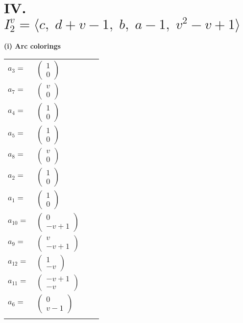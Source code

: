 \documentclass[1p]{elsarticle_modified}
\theoremstyle{definition}
\begin{document}
\centering \section*{IV. $I^v_{2}= \langle c,\;d+v-1,\;b,\;a-1,\;v^2- v+1 \rangle$}
\flushleft \textbf{(i) Arc colorings}\\
\begin{tabular}{m{7pt} m{180pt} m{7pt} m{180pt} }
\flushright $a_{3}=$&$\begin{pmatrix}1\\0\end{pmatrix}$ \\
\flushright $a_{7}=$&$\begin{pmatrix}v\\0\end{pmatrix}$ \\
\flushright $a_{4}=$&$\begin{pmatrix}1\\0\end{pmatrix}$ \\
\flushright $a_{5}=$&$\begin{pmatrix}1\\0\end{pmatrix}$ \\
\flushright $a_{8}=$&$\begin{pmatrix}v\\0\end{pmatrix}$ \\
\flushright $a_{2}=$&$\begin{pmatrix}1\\0\end{pmatrix}$ \\
\flushright $a_{1}=$&$\begin{pmatrix}1\\0\end{pmatrix}$ \\
\flushright $a_{10}=$&$\begin{pmatrix}0\\- v+1\end{pmatrix}$ \\
\flushright $a_{9}=$&$\begin{pmatrix}v\\- v+1\end{pmatrix}$ \\
\flushright $a_{12}=$&$\begin{pmatrix}1\\- v\end{pmatrix}$ \\
\flushright $a_{11}=$&$\begin{pmatrix}- v+1\\- v\end{pmatrix}$ \\
\flushright $a_{6}=$&$\begin{pmatrix}0\\v-1\end{pmatrix}$\\&\end{tabular}
\end{document}
